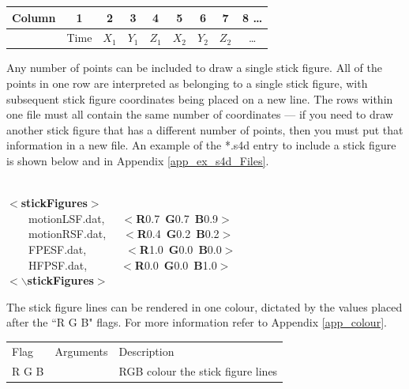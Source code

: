 \documentclass[singlecolumn,12pt]{article}
\newcommand{\hlstd}[1]{\textcolor[rgb]{0,0,0}{#1}}
\newcommand{\hlkey}[1]{\textcolor[rgb]{0,0,1}{\bf{#1}}}
\newcommand{\hlnum}[1]{\textcolor[rgb]{0.66,0,0.66}{#1}}
\begin{document}
\vspace{1cm}
\begin{center}
\begin{tabular}{c|c|c|c|c|c|c|c|c}
\hline Column & 1 & 2 & 3 & 4 & 5 & 6 & 7 & 8 \ldots \\
\hline & Time & $X_1$ & $Y_1$ & $Z_1$ & $X_2$ & $Y_2$ & $Z_2$  & \ldots\\
\end{tabular}
\end{center}
\vspace{1cm}

Any number of points can be included to draw a single stick figure.
All of the points in one row are interpreted as belonging to a
single stick figure, with subsequent stick figure coordinates being
placed on a new line. The rows within one file must all contain the
same number of coordinates --- if you need to draw another stick
figure that has a different number of points, then you must put that
information in a new file. An example of the *.s4d entry to include
a stick figure is shown below and in Appendix
\ref{app_ex_s4d_Files}.

\vspace{1cm}
\hlstd{\\
}\hlkey{$<$stickFigures$>$}\hlstd{\\
\hlstd{\ \ \ \ }motionL\textunderscore SF.dat,\hlstd{\ \ \ }}\hlkey{$<$R}\hlnum{0.7\ }\hlkey{G}\hlnum{0.7\ }\hlkey{B}\hlnum{0.9}\hlkey{$>$}\hlstd{\\
\hlstd{\ \ \ \ }motionR\textunderscore SF.dat,\hlstd{\ \ \ }}\hlkey{$<$R}\hlnum{0.4\ }\hlkey{G}\hlnum{0.2\ }\hlkey{B}\hlnum{0.2}\hlkey{$>$}\hlstd{\\
\hlstd{\ \ \ \ }FPE\textunderscore SF.dat,\hlstd{\ \ \ \ \ \ \ }}\hlkey{$<$R}\hlnum{1.0\ }\hlkey{G}\hlnum{0.0\ }\hlkey{B}\hlnum{0.0}\hlkey{$>$}\hlstd{\\
\hlstd{\ \ \ \ }HFP\textunderscore SF.dat,\hlstd{\ \ \ \ \ \ }}\hlkey{$<$R}\hlnum{0.0\ }\hlkey{G}\hlnum{0.0\ }\hlkey{B}\hlnum{1.0}\hlkey{$>$}\hlstd{\\
}\hlkey{$<$$\backslash$stickFigures$>$}\hlstd{}\mbox{} \vspace{1cm}

The stick figure lines can be rendered in one colour, dictated by
the values placed after the ``R G B" flags. For more information
refer to Appendix \ref{app_colour}.

\vspace{1cm}
\begin{tabular}{l l l}
\hline Flag & Arguments  & Description \\
R G B & & RGB colour the stick figure lines\\
\end{tabular}
\vspace{1cm}
\end{document}
